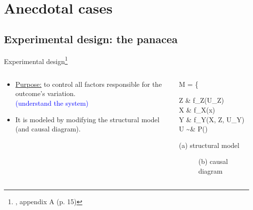 \section{Anecdotal cases}
%
%
\subsection{Experimental design: the panacea}
%
%
\begin{frame}[t, negative]
	\subsectionpage
\end{frame}
%
%
\begin{frame}
	{Experimental design\footnote{\citet{Cinelli_et_al_2021}, appendix A (p. 15)}}
	\begin{columns}
		\begin{column}{0.5\textwidth}
			\begin{itemize}
				\item \underline{Purpose:} to control all factors responsible for the outcome's variation. \\
				{\small \textcolor{blue}{(understand the system)}}
				\item It is modeled by modifying the structural model (and causal diagram).
			\end{itemize}
		\end{column}
		\begin{column}{0.5\textwidth}  
			\begin{equ}
				M = \left\{ \begin{aligned} 
					Z \leftarrow & \; f_{Z}(U_{Z}) \\
					X \leftarrow & \; f_{X}(x) \\
					Y \leftarrow & \; f_{Y}(X, Z, U_{Y}) \\
					U \sim & \; P()
				\end{aligned} \right
				\caption*{(a) structural model}
			\end{equ}
			\begin{figure}
				\caption*{(b) causal diagram}
			\end{figure}
		\end{column}
	\end{columns}
\end{frame}
